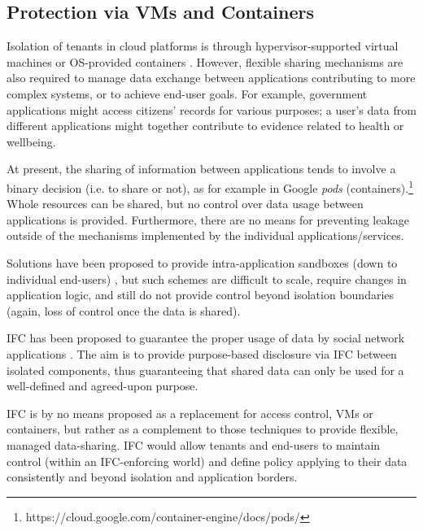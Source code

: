 \documentclass[10pt,journal,compsoc]{IEEEtran}
\begin{document}
 





\subsection{Protection via VMs and Containers}



Isolation of tenants in cloud platforms is through hypervisor-supported virtual machines \cite{barham2003a, kivity2007kvm} or OS-provided containers \cite{bernstein2014containers}. 
However, flexible sharing mechanisms are also required to manage data exchange
between applications contributing to more complex systems, or to achieve end-user goals. For example, government applications might access citizens' records for various purposes; a user's data from different applications might together contribute to evidence related to health or wellbeing. 

At present, the sharing of information between applications 
tends to involve a binary decision (i.e. to share or not), as for example in Google \emph{pods} (containers).\footnote{https://cloud.google.com/container-engine/docs/pods/}
Whole resources can be shared, but no control over data usage between applications is provided.
Furthermore, there are no means for preventing leakage outside of the mechanisms implemented by the individual applications\slash services.

Solutions have been proposed to provide intra-application 
sandboxes
(down to individual end-users) \cite{lee2013pibox}, but such schemes are difficult to scale, require changes in application logic, and still do not provide control beyond isolation boundaries (\ie again, loss of control once the data is shared).

IFC has been proposed to guarantee the proper usage of data by social network applications \cite{singh2009xbook}.
The aim is to provide purpose-based disclosure via IFC \cite{kumar2014realizing} between isolated components, thus guaranteeing that shared data can only be used for a well-defined and agreed-upon purpose. 

IFC is by no means proposed as a replacement for access control, VMs or containers, but rather as a complement to those techniques to provide flexible, managed data-sharing. IFC would allow tenants and end-users to maintain control (within an IFC-enforcing world) and define policy applying to their data consistently and beyond isolation and application borders.
\end{document}
